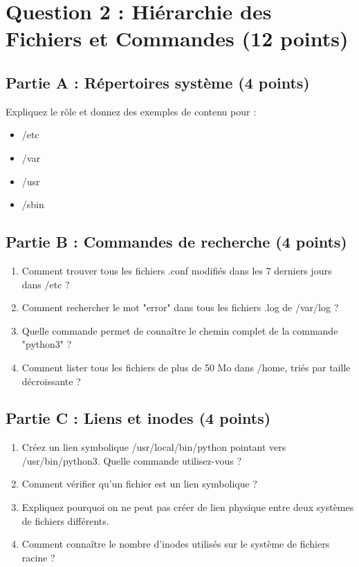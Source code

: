 \documentclass[12pt,a4paper]{article}
\begin{document}
\newpage


\section{Question 2 : Hiérarchie des Fichiers et Commandes (12 points)}

\begin{questionbox}
\subsection*{Partie A : Répertoires système (4 points)}
Expliquez le rôle et donnez des exemples de contenu pour :
\begin{itemize}
    \item /etc
    \item /var
    \item /usr
    \item /sbin
\end{itemize}

\subsection*{Partie B : Commandes de recherche (4 points)}
\begin{enumerate}[label=\alph*)]
    \item Comment trouver tous les fichiers .conf modifiés dans les 7 derniers jours dans /etc ?
    \item Comment rechercher le mot "error" dans tous les fichiers .log de /var/log ?
    \item Quelle commande permet de connaître le chemin complet de la commande "python3" ?
    \item Comment lister tous les fichiers de plus de 50 Mo dans /home, triés par taille décroissante ?
\end{enumerate}

\subsection*{Partie C : Liens et inodes (4 points)}
\begin{enumerate}[label=\alph*)]
    \item Créez un lien symbolique /usr/local/bin/python pointant vers /usr/bin/python3. Quelle commande utilisez-vous ?
    \item Comment vérifier qu'un fichier est un lien symbolique ?
    \item Expliquez pourquoi on ne peut pas créer de lien physique entre deux systèmes de fichiers différents.
    \item Comment connaître le nombre d'inodes utilisés sur le système de fichiers racine ?
\end{enumerate}
\end{questionbox}
\end{document}
